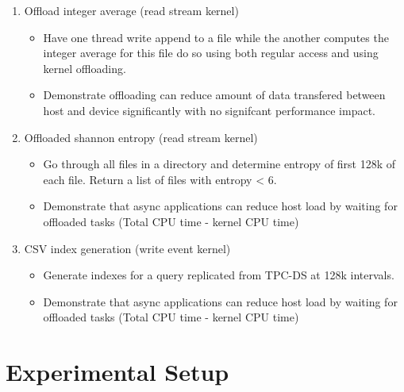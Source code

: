 \begin{enumerate}
    \item Offload integer average (read stream kernel)
    \begin{itemize}
        \item Have one thread write append to a file while the another computes
              the integer average for this file do so using both regular access
              and using kernel offloading.
        \item Demonstrate offloading can reduce amount of data transfered
              between host and device significantly with no signifcant
              performance impact.
    \end{itemize}
    \item Offloaded shannon entropy (read stream kernel)
    \begin{itemize}
        \item Go through all files in a directory and determine entropy of first
              128k of each file. Return a list of files with entropy < 6.
        \item Demonstrate that async applications can reduce host load by
              waiting for offloaded tasks (Total CPU time - kernel CPU time)
    \end{itemize}
    \item CSV index generation (write event kernel)
    \begin{itemize}
        \item Generate indexes for a query replicated from TPC-DS at 128k
              intervals.
        \item Demonstrate that async applications can reduce host load by
              waiting for offloaded tasks (Total CPU time - kernel CPU time)
    \end{itemize}
\end{enumerate}

\section{Experimental Setup}


%


